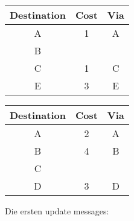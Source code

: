 \documentclass[a4paper,
			llpt,
			solution,
			accentcolor=tud2d,
			colorbacktitle
			]
			{tudexercise}
\newcommand{\8}{$\infty$}
\begin{document}
\begin{multicols}{3}
\begin{tabular}{c|c|c}
Destination & Cost & Via \\ \hline
A           & 1    & A   \\
B           &      &     \\
C           & 1    & C   \\
E           & 3    & E   \\
\end{tabular}
\begin{tabular}{c|c|c}
Destination & Cost & Via \\ \hline
A           & 2    & A   \\
B           & 4    & B   \\
C           &      &     \\
D           & 3    & D   \\
\end{tabular}
\end{multicols}
Die ersten update messages:
\end{document}
